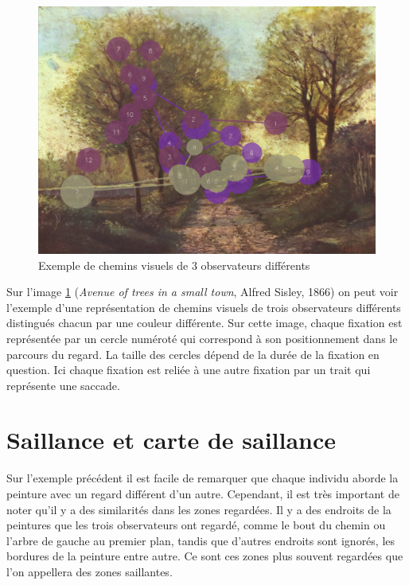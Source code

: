 \begin{figure}[!ht]
    \centering
    \includegraphics[width=0.7\linewidth]{datas/exemple_scanpaths2.png}
    \caption{Exemple de chemins visuels de 3 observateurs différents}
    \label{ex_scanpath}
\end{figure}

\par
Sur l'image \ref{ex_scanpath} (\emph{Avenue of trees in a small town}, Alfred Sisley, 1866) on peut voir l'exemple d'une représentation de chemins visuels de trois observateurs différents distingués chacun par une couleur différente. Sur cette image, chaque fixation est représentée par un cercle numéroté qui correspond à son positionnement dans le parcours du regard. La taille des cercles dépend de la durée de la fixation en question. Ici chaque fixation est reliée à une autre fixation par un trait qui représente une saccade.

\section{Saillance et carte de saillance}
\par
Sur l'exemple précédent il est facile de remarquer que chaque individu aborde la peinture avec un regard différent d'un autre. Cependant, il est très important de noter qu'il y a des similarités dans les zones regardées. Il y a des endroits de la peintures que les trois observateurs ont regardé, comme le bout du chemin ou l'arbre de gauche au premier plan, tandis que d'autres endroits sont ignorés, les bordures de la peinture entre autre. Ce sont ces zones plus souvent regardées que l'on appellera des zones saillantes.

